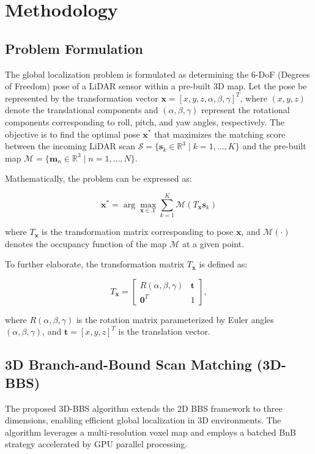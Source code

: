 \section{Methodology}
\label{sec:methodology}

\subsection{Problem Formulation}
The global localization problem is formulated as determining the 6-DoF (Degrees of Freedom) pose of a LiDAR sensor within a pre-built 3D map. Let the pose be represented by the transformation vector $\mathbf{x} = [x, y, z, \alpha, \beta, \gamma]^T$, where $(x, y, z)$ denote the translational components and $(\alpha, \beta, \gamma)$ represent the rotational components corresponding to roll, pitch, and yaw angles, respectively. The objective is to find the optimal pose $\mathbf{x}^*$ that maximizes the matching score between the incoming LiDAR scan $\mathcal{S} = \{\mathbf{s}_k \in \mathbb{R}^3 \mid k = 1, \dots, K\}$ and the pre-built map $\mathcal{M} = \{\mathbf{m}_n \in \mathbb{R}^3 \mid n = 1, \dots, N\}$.

Mathematically, the problem can be expressed as:

$$\mathbf{x}^* = \arg\max_{\mathbf{x} \in \mathcal{X}} \sum_{k=1}^{K} \mathcal{M}(T_{\mathbf{x}}\mathbf{s}_k)$$

where $T_{\mathbf{x}}$ is the transformation matrix corresponding to pose $\mathbf{x}$, and $\mathcal{M}(\cdot)$ denotes the occupancy function of the map $\mathcal{M}$ at a given point.

To further elaborate, the transformation matrix $T_{\mathbf{x}}$ is defined as:

\begin{equation*}
T_{\mathbf{x}} = \begin{bmatrix}
R(\alpha, \beta, \gamma) & \mathbf{t} \\
\mathbf{0}^T & 1
\end{bmatrix},
\end{equation*}

where $R(\alpha, \beta, \gamma)$ is the rotation matrix parameterized by Euler angles $(\alpha, \beta, \gamma)$, and $\mathbf{t} = [x, y, z]^T$ is the translation vector.

\subsection{3D Branch-and-Bound Scan Matching (3D-BBS)}
The proposed 3D-BBS algorithm extends the 2D BBS framework to three dimensions, enabling efficient global localization in 3D environments. The algorithm leverages a multi-resolution voxel map and employs a batched BnB strategy accelerated by GPU parallel processing.

